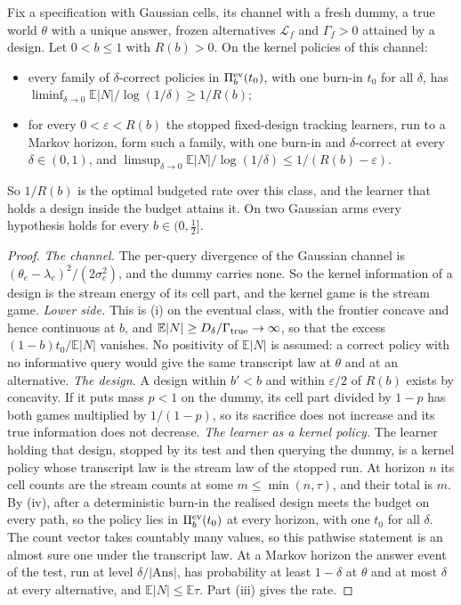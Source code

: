 \begin{theorem}
\label{thm:optrate}
Fix a specification with Gaussian cells, its channel with a fresh dummy, a true world $\theta$
with a unique answer, frozen alternatives $\mathcal L_f$ and $\Gamma_f>0$ attained by a design.
Let $0<b\le1$ with $R(b)>0$. On the kernel policies of this channel:
\begin{itemize}
\item every family of $\delta$-correct policies in $\Pi_b^{\rm ev}(t_0)$, with one burn-in $t_0$
for all $\delta$, has $\liminf_{\delta\to0}\mathbb E|N|/\log(1/\delta)\ge1/R(b)$;
\item for every $0<\varepsilon<R(b)$ the stopped fixed-design tracking learners, run to a Markov
horizon, form such a family, with one burn-in and $\delta$-correct at every $\delta\in(0,1)$, and
$\limsup_{\delta\to0}\mathbb E|N|/\log(1/\delta)\le1/(R(b)-\varepsilon)$.
\end{itemize}
So $1/R(b)$ is the optimal budgeted rate over this class, and the learner that holds a design
inside the budget attains it. On two Gaussian arms every hypothesis holds for every
$b\in(0,\frac12]$.
\end{theorem}
\begin{proof}
\emph{The channel.} The per-query divergence of the Gaussian channel is
$(\theta_e-\lambda_e)^2/(2\sigma_e^2)$, and the dummy carries none. So the kernel information of a
design is the stream energy of its cell part, and the kernel game is the stream game.
\emph{Lower side.} This is (i) on the eventual class, with the frontier concave and hence
continuous at $b$, and $\mathbb E|N|\ge D_\delta/\Gamma_{\rm true}\to\infty$, so that the excess
$(1-b)t_0/\mathbb E|N|$ vanishes. No positivity of $\mathbb E|N|$ is assumed: a correct policy
with no informative query would give the same transcript law at $\theta$ and at an alternative.
\emph{The design.} A design within $b'<b$ and within $\varepsilon/2$ of $R(b)$ exists by
concavity. If it puts mass $p<1$ on the dummy, its cell part divided by $1-p$ has both games
multiplied by $1/(1-p)$, so its sacrifice does not increase and its true information does not
decrease.
\emph{The learner as a kernel policy.} The learner holding that design, stopped by its test and
then querying the dummy, is a kernel policy whose transcript law is the stream law of the stopped
run. At horizon $n$ its cell counts are the stream counts at some $m\le\min(n,\tau)$, and their
total is $m$. By (iv), after a deterministic burn-in the realised design meets the budget on
every path, so the policy lies in $\Pi_b^{\rm ev}(t_0)$ at every horizon, with one $t_0$ for all
$\delta$. The count vector takes countably many values, so this pathwise statement is an almost
sure one under the transcript law. At a Markov horizon the answer event of the test, run at level
$\delta/|\mathrm{Ans}|$, has probability at least $1-\delta$ at $\theta$ and at most $\delta$ at
every alternative, and $\mathbb E|N|\le\mathbb E\tau$. Part (iii) gives the rate.
\end{proof}
